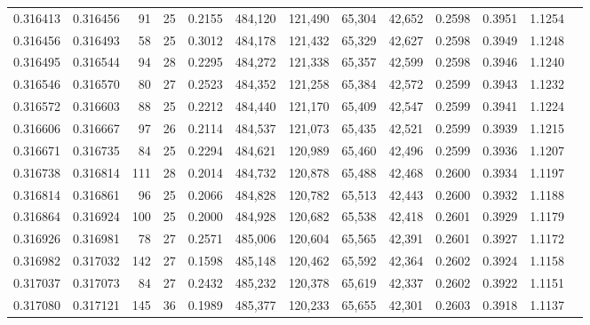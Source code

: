 \begin{tabular}{rrrrrrrrrrrrr}
0.316413 & 0.316456 &    91 &  25 &                                     0.2155 & 484,120 & 121,490 &  65,304 &  42,652 & 0.2598 & 0.3951 & 1.1254 \\
0.316456 & 0.316493 &    58 &  25 &                                     0.3012 & 484,178 & 121,432 &  65,329 &  42,627 & 0.2598 & 0.3949 & 1.1248 \\
0.316495 & 0.316544 &    94 &  28 &                                     0.2295 & 484,272 & 121,338 &  65,357 &  42,599 & 0.2598 & 0.3946 & 1.1240 \\
0.316546 & 0.316570 &    80 &  27 &                                     0.2523 & 484,352 & 121,258 &  65,384 &  42,572 & 0.2599 & 0.3943 & 1.1232 \\
0.316572 & 0.316603 &    88 &  25 &                                     0.2212 & 484,440 & 121,170 &  65,409 &  42,547 & 0.2599 & 0.3941 & 1.1224 \\
0.316606 & 0.316667 &    97 &  26 &                                     0.2114 & 484,537 & 121,073 &  65,435 &  42,521 & 0.2599 & 0.3939 & 1.1215 \\
0.316671 & 0.316735 &    84 &  25 &                                     0.2294 & 484,621 & 120,989 &  65,460 &  42,496 & 0.2599 & 0.3936 & 1.1207 \\
0.316738 & 0.316814 &   111 &  28 &                                     0.2014 & 484,732 & 120,878 &  65,488 &  42,468 & 0.2600 & 0.3934 & 1.1197 \\
0.316814 & 0.316861 &    96 &  25 &                                     0.2066 & 484,828 & 120,782 &  65,513 &  42,443 & 0.2600 & 0.3932 & 1.1188 \\
0.316864 & 0.316924 &   100 &  25 &                                     0.2000 & 484,928 & 120,682 &  65,538 &  42,418 & 0.2601 & 0.3929 & 1.1179 \\
0.316926 & 0.316981 &    78 &  27 &                                     0.2571 & 485,006 & 120,604 &  65,565 &  42,391 & 0.2601 & 0.3927 & 1.1172 \\
0.316982 & 0.317032 &   142 &  27 &                                     0.1598 & 485,148 & 120,462 &  65,592 &  42,364 & 0.2602 & 0.3924 & 1.1158 \\
0.317037 & 0.317073 &    84 &  27 &                                     0.2432 & 485,232 & 120,378 &  65,619 &  42,337 & 0.2602 & 0.3922 & 1.1151 \\
0.317080 & 0.317121 &   145 &  36 &                                     0.1989 & 485,377 & 120,233 &  65,655 &  42,301 & 0.2603 & 0.3918 & 1.1137 \\

\end{tabular}

